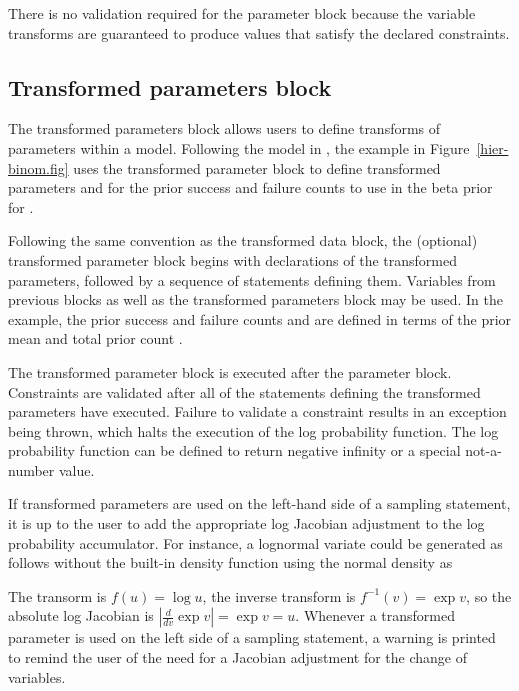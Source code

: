 \documentclass[article]{jss}
\begin{document}
There is no validation required for the parameter block because the
variable transforms are guaranteed to produce values that satisfy the
declared constraints.


\subsection{Transformed parameters block}

The transformed parameters block allows users to define transforms of
parameters within a model.  Following the model in
\citep{GelmanEtAl:2013}, the example in Figure~\ref{hier-binom.fig}
uses the transformed parameter block to define transformed parameters
 and  for the prior success and failure counts
to use in the beta prior for .  

Following the same convention as the transformed data block, the
(optional) transformed parameter block begins with declarations of the
transformed parameters, followed by a sequence of statements defining
them.  Variables from previous blocks as well as the transformed
parameters block may be used.  In the example, the prior success and
failure counts  and  are defined in terms of
the prior mean  and total prior count .

The transformed parameter block is executed after the parameter
block.  Constraints are validated after all of the statements defining the
transformed parameters have executed.  Failure to validate a
constraint results in an exception being thrown, which halts the
execution of the log probability function.  The log probability
function can be defined to return negative infinity or a special
not-a-number value. 

If transformed parameters are used on the left-hand side of a sampling
statement, it is up to the user to add the appropriate log Jacobian
adjustment to the log probability accumulator.  For instance, a
lognormal variate could be generated as follows without the built-in
 density function  using the normal density as
%
\begin{Code}
parameters {
  real<lower=0> u;
  ...
transformed parameters {
  real v;
  v <- log(u);
  lp__ <- lp__ + u;   // log Jacobian adjustment
}
model {
  v ~ normal(0,1);
}
\end{Code}
%
The transorm is $f(u) = \log u$, the inverse transform is $f^{-1}(v) =
\exp v$, so the absolute log Jacobian is $|\frac{d}{dv} \exp v| =
\exp v = u$.  Whenever a transformed parameter is used on the left
side of a sampling statement, a warning is printed to remind the user
of the need for a Jacobian adjustment for the change of variables.
\end{document}

